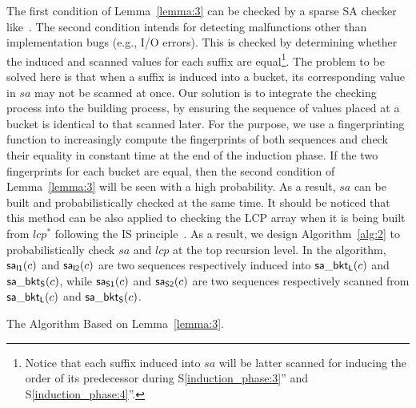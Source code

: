 \documentclass[10pt,journal,compsoc]{IEEEtran}
\begin{document}
The first condition of Lemma~\ref{lemma:3} can be checked by a sparse SA checker like~\cite{wu2017}. The second condition intends for detecting malfunctions other than implementation bugs (e.g., I/O errors). This is checked by determining whether the induced and scanned values for each suffix are equal\footnote{Notice that each suffix induced into $sa$ will be latter scanned for inducing the order of its predecessor during S\ref{induction_phase:3}'' and S\ref{induction_phase:4}''. }. The problem to be solved here is that when a suffix is induced into a bucket, its corresponding value in $sa$ may not be scanned at once. Our solution is to integrate the checking process into the building process, by ensuring the sequence of values placed at a bucket is identical to that scanned later. For the purpose, we use a fingerprinting function to increasingly compute the fingerprints of both sequences and check their equality in constant time at the end of the induction phase. If the two fingerprints for each bucket are equal, then the second condition of Lemma~\ref{lemma:3} will be seen with a high probability. As a result, $sa$ can be built and probabilistically checked at the same time. It should be noticed that this method can be also applied to checking the LCP array when it is being built from $lcp^*$ following the IS principle~\cite{Fischer11}. As a result, we design Algorithm~\ref{alg:2} to probabilistically check $sa$ and $lcp$ at the top recursion level. In the algorithm, ${\sf sa_{I1}}(c)$ and ${\sf sa_{I2}}(c)$ are two sequences respectively induced into ${\sf sa\_bkt_L}(c)$ and ${\sf sa\_bkt_S}(c)$, while ${\sf sa_{S1}}(c)$ and ${\sf sa_{S2}}(c)$ are two sequences respectively scanned from ${\sf sa\_bkt_L}(c)$ and ${\sf sa\_bkt_S}(c)$. 


\begin{algorithm*}

	\caption{The Algorithm Based on Lemma~\ref{lemma:3}.}
	
	\label{alg:2}
	
	\end{algorithm*}
\end{document}
